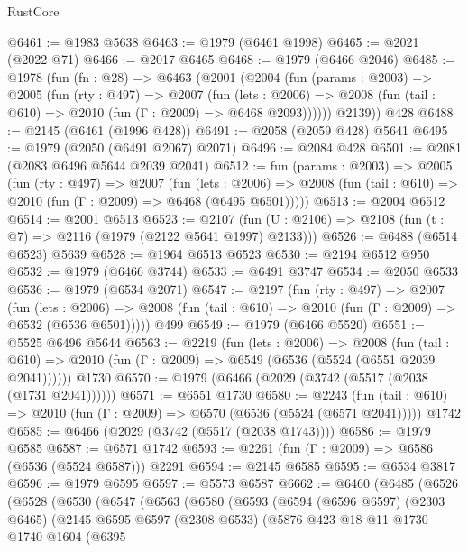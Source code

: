 \begin{lexlean}{RustCore}
\begin{coremodule}
@6461 := @1983 @5638
@6463 := @1979 (@6461 @1998)
@6465 := @2021 (@2022 @71)
@6466 := @2017 @6465
@6468 := @1979 (@6466 @2046)
@6485 := @1978
    (fun (fn : @28) =>
    @6463
      (@2001
        (@2004
          (fun (params : @2003) =>
          @2005
            (fun (rty : @497) =>
            @2007
              (fun (lets : @2006) =>
              @2008 (fun (tail : @610) => @2010 (fun (Γ : @2009) => @6468 @2093))))))
        @2139))
    @428
@6488 := @2145 (@6461 (@1996 @428))
@6491 := @2058 (@2059 @428) @5641
@6495 := @1979 (@2050 (@6491 @2067) @2071)
@6496 := @2084 @428
@6501 := @2081 (@2083 @6496 @5644 @2039 @2041)
@6512 := fun (params : @2003) =>
  @2005
    (fun (rty : @497) =>
    @2007
      (fun (lets : @2006) =>
      @2008 (fun (tail : @610) => @2010 (fun (Γ : @2009) => @6468 (@6495 @6501)))))
@6513 := @2004 @6512
@6514 := @2001 @6513
@6523 := @2107 (fun (U : @2106) => @2108 (fun (t : @7) => @2116 (@1979 (@2122 @5641 @1997) @2133)))
@6526 := @6488 (@6514 @6523) @5639
@6528 := @1964 @6513 @6523
@6530 := @2194 @6512 @950
@6532 := @1979 (@6466 @3744)
@6533 := @6491 @3747
@6534 := @2050 @6533
@6536 := @1979 (@6534 @2071)
@6547 := @2197
    (fun (rty : @497) =>
    @2007
      (fun (lets : @2006) =>
      @2008 (fun (tail : @610) => @2010 (fun (Γ : @2009) => @6532 (@6536 @6501)))))
    @499
@6549 := @1979 (@6466 @5520)
@6551 := @5525 @6496 @5644
@6563 := @2219
    (fun (lets : @2006) =>
    @2008
      (fun (tail : @610) => @2010 (fun (Γ : @2009) => @6549 (@6536 (@5524 (@6551 @2039 @2041))))))
    @1730
@6570 := @1979 (@6466 (@2029 (@3742 (@5517 (@2038 (@1731 @2041))))))
@6571 := @6551 @1730
@6580 := @2243
    (fun (tail : @610) => @2010 (fun (Γ : @2009) => @6570 (@6536 (@5524 (@6571 @2041)))))
    @1742
@6585 := @6466 (@2029 (@3742 (@5517 (@2038 @1743))))
@6586 := @1979 @6585
@6587 := @6571 @1742
@6593 := @2261 (fun (Γ : @2009) => @6586 (@6536 (@5524 @6587))) @2291
@6594 := @2145 @6585
@6595 := @6534 @3817
@6596 := @1979 @6595
@6597 := @5573 @6587
@6662 := @6460
    (@6485
      (@6526
        (@6528
          (@6530
            (@6547
              (@6563
                (@6580
                  (@6593
                    (@6594
                      (@6596 @6597)
                      (@2303 @6465)
                      (@2145
                        @6595
                        @6597
                        (@2308 @6533)
                        (@5876
                          @423
                          @18
                          @11
                          @1730
                          @1740
                          @1604
                          (@6395

\end{coremodule}
\end{lexlean}
